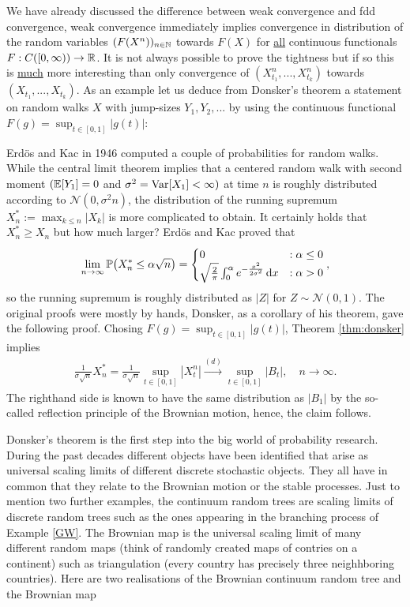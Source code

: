 We have already discussed the difference between weak convergence and fdd convergence, weak convergence immediately implies convergence in distribution of the random variables $(F(X^n))_{n\in\mathbb{N}}$ towards $F(X)$ for \underline{all} continuous functionals $F:C([0,\infty))\to \mathbb{R}$. It is not always possible to prove the tightness but if so this is \underline{much} more interesting than only convergence of $(X^n_{t_1},...,X^n_{t_k})$ towards $(X_{t_1},...,X_{t_k})$. As an example let us deduce from Donsker's theorem a statement on random walks $X$ with jump-sizes $Y_1,Y_2,...$ by using the continuous functional $F(g)=\sup_{t\in [0,1]}|g(t)|$:
\begin{laufmerksamkeit}
	Erd\"os and Kac in 1946 computed a couple of probabilities for random walks. While the central limit theorem implies that a centered random walk with second moment $(\mathbb{E}[Y_1]=0$ and $\sigma^2=\operatorname{Var}[X_1]<\infty)$ at time $n$ is roughly distributed according to $\mathcal N(0,\sigma^2 n)$, the distribution of the running supremum $X^*_n:=\max_{k\leq n}|X_k|$ is more complicated to obtain. It certainly holds that $X^*_n\geq X_n$ but how much larger? Erd\"os and Kac proved that 
	\begin{align*}
		\lim_{n\to\infty}\mathbb P\big(X^*_n\leq \alpha \sqrt{n}\big)= \begin{cases}
			0&:\alpha \leq 0\\
			\sqrt{\frac{2}{\pi}}\int_0^\alpha e^{-\frac{x^2}{2\sigma^2}}\, \mathrm{d} x&: \alpha>0
		\end{cases},
	\end{align*}
	so the running supremum is roughly distributed as $|Z|$ for $Z\sim \mathcal N(0,1)$. 
	The original proofs were mostly by hands, Donsker, as a corollary of his theorem, gave the following proof. Chosing $F(g)=\sup_{t\in [0,1]}|g(t)|$, Theorem \ref{thm:donsker} implies 
	\begin{align*}
		\frac{1}{\sigma \sqrt{n}} X^*_n=\frac{1}{\sigma \sqrt{n}}\sup_{t\in [0,1]} |X_t^n| \overset{(d)}{\rightarrow} \sup_{t\in [0,1]}|B_t|,\quad n\to\infty.
	\end{align*}
	The righthand side is known to have the same distribution as $|B_1|$ by the so-called reflection principle of the Brownian motion, hence, the claim follows.
\end{laufmerksamkeit}
Donsker's theorem is the first step into the big world of probability research. During the past decades different objects have been identified that arise as universal scaling limits of different discrete stochastic objects. They all have in common that they relate to the Brownian motion or the stable processes. Just to mention two further examples, the continuum random trees are scaling limits of discrete random trees such as the ones appearing in the branching process of Example \ref{GW}. The Brownian map is the universal scaling limit of many different random maps (think of randomly created maps of contries on a continent) such as triangulation (every country has precisely three neighhboring countries). Here are two realisations of the Brownian continuum random tree and the Brownian map 
